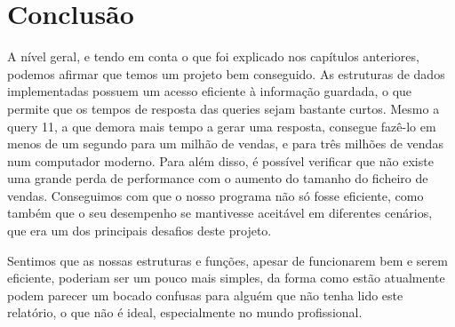 \documentclass[a4paper]{report}
\begin{document}
	\chapter{Conclusão}

	A nível geral, e tendo em conta o que foi explicado nos capítulos anteriores, podemos afirmar que temos um
	projeto bem conseguido. As estruturas de dados implementadas possuem um acesso eficiente à informação
	guardada, o que permite que os tempos de resposta das queries sejam bastante curtos. Mesmo a query 11,
	a que demora mais tempo a gerar uma resposta, consegue fazê-lo em menos de um segundo para um milhão de
	vendas, e para três milhões de vendas num computador moderno. Para além disso, é possível verificar que
	não existe uma grande perda de performance com o aumento do tamanho do ficheiro	de vendas. Conseguimos
	com que o nosso programa não só fosse eficiente, como também que o seu desempenho se
	mantivesse aceitável em diferentes cenários, que era um dos principais desafios deste projeto.

	Sentimos que as nossas estruturas e funções, apesar de funcionarem bem e serem eficiente, poderiam
	ser um pouco mais simples, da forma como estão atualmente podem parecer um bocado confusas para alguém
	que não tenha lido este relatório, o que não é ideal, especialmente no mundo profissional.
\end{document}
